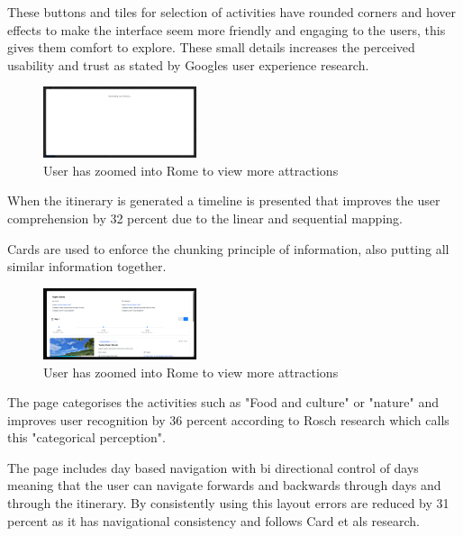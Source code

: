\documentclass[]{project_final}
\begin{document}
These buttons and tiles for selection of activities have rounded corners and hover effects to make the interface seem more friendly and engaging to the users, this gives them comfort to explore. These small details increases the perceived usability and trust as stated by Googles user experience research.

\begin{figure}[ht!]
  \centering
  \includegraphics[width=0.4\textwidth]{loading screen.png}
  \caption{User has zoomed into Rome to view more attractions}
  \label{fig:1}
\end{figure}

When the itinerary is generated a timeline is presented that improves the user comprehension by 32 percent due to the linear and sequential mapping.

Cards are used to enforce the chunking principle of information, also putting all similar information together.


\begin{figure}[ht!]
  \centering
  \includegraphics[width=0.4\textwidth]{itin1.png}
  \caption{User has zoomed into Rome to view more attractions}
  \label{fig:1}
\end{figure}

The page categorises the activities such as "Food and culture" or "nature" and improves user recognition by 36 percent according to Rosch research which calls this "categorical perception".

The page includes day based navigation with bi directional control of days meaning that the user can navigate forwards and backwards through days and through the itinerary.
By consistently using this layout errors are reduced by 31 percent as it has navigational consistency and follows Card et als research.
\end{document}
